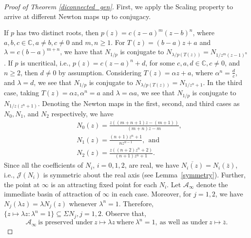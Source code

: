 \documentclass[12pt]{article}
\numberwithin{equation}{section}
\begin{document}
\begin{proof}[Proof of Theorem \ref{diconnected_gen}]
	First, we apply the Scaling property to arrive at different Newton maps up to conjugacy.
	\par  If $p$ has two distinct roots, then $p(z)=c(z-a)^m(z-b)^n$, where $a,b,c \in \mathbb{C}, a\neq b, c \neq 0$ and $m,n \geq 1$. For $T(z)=(b-a)z+a$ and $\lambda =c (b-a)^{m+n}$, we have that $N_{1/p}$ is conjugate to $N_{ \lambda/p(T(z))}=N_{1/z^m (z-1)^n}$.
	If $p$ is uncritical, i.e., $p(z)=c(z-a)^n +d$, for some $c,a, d\in \mathbb{C}, c \neq 0$, and $n \geq 2$, then $d \neq 0$ by assumption. Considering $T(z)=\alpha z+a$, where $\alpha^n=\frac{d}{c}$, and $\lambda =d$, we see that $N_{1/p}$ is conjugate to $N_{ \lambda/p(T(z))}=N_{1/z^n +1}$. In the third case, taking $T(z)=\alpha z, \alpha^n =a$ and $\lambda =\alpha a$, we see that $N_{1/p}$ is conjugate to  $N_{1/z(z^n +1)}$. Denoting the Newton maps in the first, second, and third cases as $N_0, N_1$, and $N_2$ respectively, we have
    \begin{align}
       & N_0(z)=\frac{z((m+n+1)z-(m+1))}{(m+n)z-m},\\
       & N_1(z)=\frac{(n+1)z^n+1}{nz^{n-1}}, ~~\mbox{and} \\
       & N_2(z)=\frac{z((n+2)z^n+2)}{(n+1)z^n+1}.
    \end{align}
Since all the coefficients of $N_i$, $i=0,1,2$, are real, we have $\overline{N_i(z)}=N_i(\bar{z})$, i.e., $\mathcal{J}(N_i)$ is symmetric about the real axis (see Lemma~\ref{symmetry}). Further, the point at $\infty$ is an attracting fixed point for each $N_i$. Let $\mathcal{A}_\infty$ denote the immediate basin of attraction of $\infty$ in each case. Moreover, for $j=1,2$, we have $N_j(\lambda z)=\lambda N_j(z)$ whenever $\lambda^n=1$. Therefore, 
$\{z\mapsto \lambda z: \lambda^n=1 \}\subseteq \Sigma N_j, j=1,2.$  Observe that,
\begin{equation}\label{sym_New}
\mathcal{A}_{\infty}~\mbox{is preserved under}~ z \mapsto \lambda z ~\mbox{where}~ \lambda^n =1, ~\mbox{as well as under}~ z \mapsto \overline{z}.\end{equation}



\end{proof}
\end{document}
